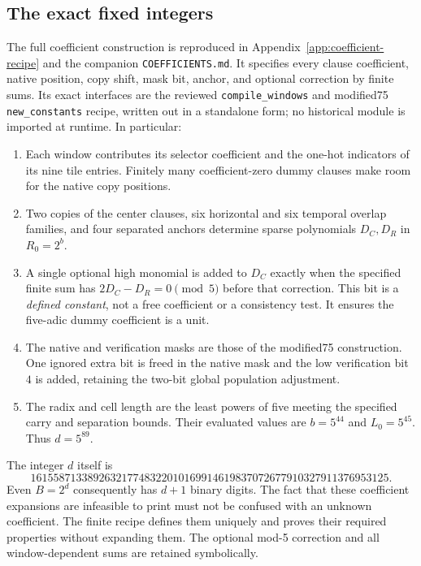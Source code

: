 \documentclass[11pt]{article}
\theoremstyle{definition}
\begin{document}
\subsection{The exact fixed integers}

The full coefficient construction is reproduced in
Appendix~\ref{app:coefficient-recipe} and the companion
\texttt{COEFFICIENTS.md}. It specifies every clause coefficient, native
position, copy shift, mask bit, anchor, and optional correction by finite
sums. Its exact interfaces are the reviewed
\texttt{compile\_windows} and modified75 \texttt{new\_constants} recipe,
written out in a standalone form; no historical module is imported at
runtime. In particular:

\begin{enumerate}
\item Each window contributes its selector coefficient and the one-hot
indicators of its nine tile entries. Finitely many coefficient-zero dummy
clauses make room for the native copy positions.
\item Two copies of the center clauses, six horizontal and six temporal
overlap families, and four separated anchors determine sparse polynomials
$D_C,D_R$ in $R_0=2^b$.
\item A single optional high monomial is added to $D_C$ exactly when the
specified finite sum has $2D_C-D_R=0\pmod5$ before that correction. This
bit is a \emph{defined constant}, not a free coefficient or a consistency
test. It ensures the five-adic dummy coefficient is a unit.
\item The native and verification masks are those of the modified75
construction. One ignored extra bit is freed in the native mask and the
low verification bit $4$ is added, retaining the two-bit global population
adjustment.
\item The radix and cell length are the least powers of five meeting the
specified carry and separation bounds. Their evaluated values are
$b=5^{44}$ and $L_0=5^{45}$. Thus $d=5^{89}$.
\end{enumerate}

The integer $d$ itself is
\[
161558713389263217748322010169914619837072677910327911376953125.
\]
Even $B=2^d$ consequently has $d+1$ binary digits. The fact that these
coefficient expansions are infeasible to print must not be confused with
an unknown coefficient. The finite recipe defines them uniquely and proves
their required properties without expanding them. The optional mod-5
correction and all window-dependent sums are retained symbolically.
\end{document}
